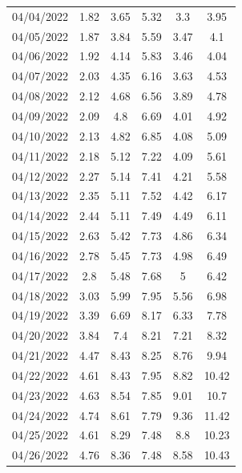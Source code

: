 \documentclass[withoutpreface,bwprint]{cumcmthesis} %
\begin{document}
\begin{appendices}
\begin{center}
\begin{longtable}{c|ccccc}
04/04/2022 & 1.82  & 3.65     & 5.32      & 3.3    & 3.95          \\
04/05/2022 & 1.87  & 3.84     & 5.59      & 3.47   & 4.1           \\
04/06/2022 & 1.92  & 4.14     & 5.83      & 3.46   & 4.04          \\
04/07/2022 & 2.03  & 4.35     & 6.16      & 3.63   & 4.53          \\
04/08/2022 & 2.12  & 4.68     & 6.56      & 3.89   & 4.78          \\
04/09/2022 & 2.09  & 4.8      & 6.69      & 4.01   & 4.92          \\
04/10/2022 & 2.13  & 4.82     & 6.85      & 4.08   & 5.09          \\
04/11/2022 & 2.18  & 5.12     & 7.22      & 4.09   & 5.61          \\
04/12/2022 & 2.27  & 5.14     & 7.41      & 4.21   & 5.58          \\
04/13/2022 & 2.35  & 5.11     & 7.52      & 4.42   & 6.17          \\
04/14/2022 & 2.44  & 5.11     & 7.49      & 4.49   & 6.11          \\
04/15/2022 & 2.63  & 5.42     & 7.73      & 4.86   & 6.34          \\
04/16/2022 & 2.78  & 5.45     & 7.73      & 4.98   & 6.49          \\
04/17/2022 & 2.8   & 5.48     & 7.68      & 5      & 6.42          \\
04/18/2022 & 3.03  & 5.99     & 7.95      & 5.56   & 6.98          \\
04/19/2022 & 3.39  & 6.69     & 8.17      & 6.33   & 7.78          \\
04/20/2022 & 3.84  & 7.4      & 8.21      & 7.21   & 8.32          \\
04/21/2022 & 4.47  & 8.43     & 8.25      & 8.76   & 9.94          \\
04/22/2022 & 4.61  & 8.43     & 7.95      & 8.82   & 10.42         \\
04/23/2022 & 4.63  & 8.54     & 7.85      & 9.01   & 10.7          \\
04/24/2022 & 4.74  & 8.61     & 7.79      & 9.36   & 11.42         \\
04/25/2022 & 4.61  & 8.29     & 7.48      & 8.8    & 10.23         \\
04/26/2022 & 4.76  & 8.36     & 7.48      & 8.58   & 10.43 
\\
\bottomrule
\end{longtable}
\end{center}


\end{appendices}
\end{document}
